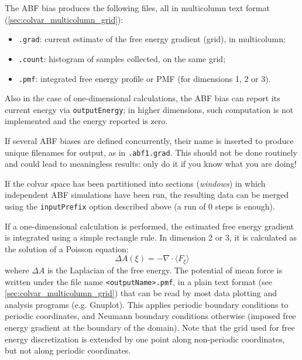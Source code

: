 
The ABF bias produces the following files, all in multicolumn text format (\ref{sec:colvar_multicolumn_grid}):
\begin{itemize}
\item \outputName\texttt{.grad}: current estimate of the free energy gradient (grid),
  in multicolumn;
\item \outputName\texttt{.count}: histogram of samples collected, on the same grid;
\item \outputName\texttt{.pmf}: integrated free energy profile or PMF (for dimensions 1, 2 or 3).
\end{itemize}

Also in the case of one-dimensional calculations, the ABF bias can report its current energy via \texttt{outputEnergy}; in higher dimensions, such computation is not implemented and the energy reported is zero.

If several ABF biases are defined concurrently, their name is inserted to produce
unique filenames for output, as in \outputName\texttt{.abf1.grad}.
This should not be done routinely and could lead to meaningless results:
only do it if you know what you are doing!

If the colvar space has been partitioned into sections (\emph{windows}) in which independent
ABF simulations have been run, the resulting data can be merged using the
\texttt{inputPrefix} option described above (a run of 0 steps is enough).




If a one-dimensional calculation is performed, the estimated free energy
gradient is integrated using a simple rectangle rule.
In dimension 2 or 3, it is calculated as the solution of a Poisson equation:
\begin{equation}
 \Delta A(\xi) = - \nabla \cdot \langle F_\xi \rangle
\end{equation}
wehere $\Delta A$ is the Laplacian of the free energy.
The potential of mean force is written under the file name \texttt{<outputName>.pmf},
in a plain text format (see \ref{sec:colvar_multicolumn_grid}) that can be read by most data plotting and analysis programs (e.g.{} Gnuplot).
This applies periodic boundary conditions to periodic coordinates, and Neumann boundary
conditions otherwise (imposed free energy gradient at the boundary of the domain).
Note that the grid used for free energy discretization is extended by one point along
non-periodic coordinates, but not along periodic coordinates.

